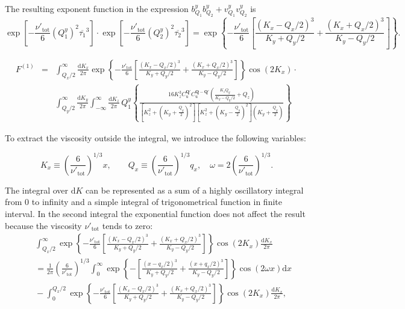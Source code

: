 \documentclass[a4paper,11pt]{article}
\begin{document}
The resulting exponent function in the expression $b^y_{Q_1}b^y_{Q_2} + v^y_{Q_1}v^y_{Q_2}$ is
\begin{equation*}
 \exp[-\frac{\nu'_{\mathrm{tot}}}{6}(Q_1^y)^2\overline{\tau_1}^3] \cdot \exp[-\frac{\nu'_{\mathrm{tot}}}{6}(Q_2^y)^2\overline{\tau_2}^3] =
 \exp\left\{ -\frac{\nu'_{\mathrm{tot}}}{6}\left[\frac{(K_x-Q_x/2)^3}{K_y+Q_y/2}+\frac{(K_x+Q_x/2)^3}{K_y-Q_y/2}\right]\right\}.
\end{equation*}
%

\begin{eqnarray}
  F^{(1)}&=&\int_{Q_x/2}^\infty \frac{\mathrm{d}K_x}{2\pi}  \exp\left\{ -\frac{\nu'_{\mathrm{tot}}}{6}\left[\frac{(K_x-Q_x/2)^3}{K_y+Q_y/2}+\frac{(K_x+Q_x/2)^3}{K_y-Q_y/2}\right]\right\} \cos(2K_x) \cdot \nonumber \\ 
  &&\int_{Q_y/2}^\infty \frac{\mathrm{d}K_y}{2\pi} \int_{-\infty}^\infty \frac{\mathrm{d}K_z}{2\pi} \, Q_1^y 
  \left\{ \frac{16K_z^3 C_\mathrm{u}^{\mathbf{Q}'}C_\mathrm{u}^{\mathbf{Q-Q}'}  \left( \frac{K_z Q_y}{K_y - Q_y/2} + Q_z\right) }
  { \left[K_z^2 + \left(K_y+\frac{Q_y}2 \right)^2\right] \left[K_z^2 + \left(K_y - \frac{Q_y}2 \right)^2\right]\left(K_y +\frac{Q_y}2 \right) }  \right\}
\end{eqnarray}


To extract the viscosity outside the integral, we introduce the following variables:


$$ K_x \equiv \left(\frac{6}{\nu'_\mathrm{tot}}\right)^{1/3} x, \qquad Q_x \equiv \left(\frac{6}{\nu'_\mathrm{tot}}\right)^{1/3} q_x,\quad \omega=2\left(\frac{6}{\nu'_\mathrm{tot}}\right)^{1/3}. $$

The integral over $\mathrm{d}K$ can be represented as a sum of a highly oscillatory integral from $0$ to infinity and a simple integral of trigonometrical function in finite interval.
In the second integral the exponential function does not affect the result because the viscosity $\nu'_\mathrm{tot}$ tends to zero:
%
\begin{eqnarray}
&& \int_{Q_x/2}^\infty \exp\left\{ -\frac{\nu'_{\mathrm{tot}}}{6}\left[\frac{(K_x-Q_x/2)^3}{K_y+Q_y/2}+\frac{(K_x+Q_x/2)^3}{K_y-Q_y/2}\right]\right\} \cos(2K_x) \frac{\mathrm{d}K_x}{2\pi} \\
&&{}= \frac1{2\pi}\left(\frac{6}{\nu'_\mathrm{tot}}\right)^{1/3}\int_{0}^\infty \exp\left\{-\left[\frac{(x-q_x/2)^3}{K_y+Q_y/2}+\frac{(x+q_x/2)^3}{K_y-Q_y/2}\right]\right\} \cos(2\omega x) \mathrm{d}x  \nonumber \\
&&{}- \int_0^{Q_x/2} \exp\left\{ -\frac{\nu'_{\mathrm{tot}}}{6}\left[\frac{(K_x-Q_x/2)^3}{K_y+Q_y/2}+\frac{(K_x+Q_x/2)^3}{K_y-Q_y/2}\right]\right\} \cos(2K_x) \frac{\mathrm{d}K_x}{2\pi},\nonumber
\end{eqnarray}
\end{document}
